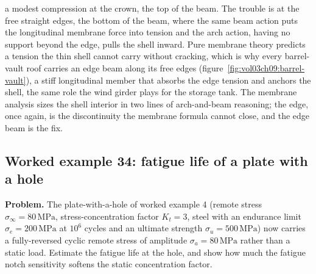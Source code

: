 a modest compression at the crown, the top of the beam. The trouble is at the
free straight edges, the bottom of the beam, where the same beam action puts
the longitudinal membrane force into tension and the arch action, having no
support beyond the edge, pulls the shell inward. Pure membrane theory predicts
a tension the thin shell cannot carry without cracking, which is why every
barrel-vault roof carries an edge beam along its free edges
(figure~\ref{fig:vol03ch09:barrel-vault}), a stiff longitudinal member that
absorbs the edge tension and anchors the shell, the same role the wind girder
plays for the storage tank. The membrane analysis sizes the shell interior in
two lines of arch-and-beam reasoning; the edge, once again, is the
discontinuity the membrane formula cannot close, and the edge beam is the fix.

\subsection*{Worked example 34: fatigue life of a plate with a hole}

\textbf{Problem.} The plate-with-a-hole of worked example 4 (remote stress
$\sigma_\infty = 80\,\text{MPa}$, stress-concentration factor $K_t = 3$,
steel with an endurance limit $\sigma_e = 200\,\text{MPa}$ at $10^6$ cycles
and an ultimate strength $\sigma_u = 500\,\text{MPa}$) now carries a
fully-reversed cyclic remote stress of amplitude $\sigma_a = 80\,\text{MPa}$
rather than a static load. Estimate the fatigue life at the hole, and show how
much the fatigue notch sensitivity softens the static concentration factor.


